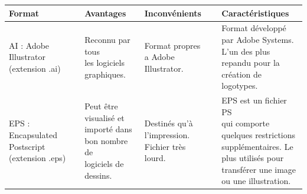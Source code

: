 \begin{table}[H]
	\centering
	\begin{tabular}{|l|l|l|l|}
		
		\hline
		\textbf{Format} & \textbf{Avantages} &
		\textbf{Inconvénients} & \textbf{Caractéristiques} \\
		\hline
		\makecell{AI : Adobe\\
			Illustrator \\(extension .ai)}
		 & \makecell{Reconnu par\\
			tous\\
			les logiciels\\
			graphiques.} & \makecell{Format propres\\ a
		Adobe Illustrator.}
		&  \makecell{Format développé\\
			par Adobe Systems.\\
			L'un des plus\\
			repandu pour la\\
			création de logotypes.}   \\
		\hline
		
		\makecell{EPS :
			Encapsulated\\
			Postscript\\
			(extension
			.eps)}
		& \makecell{Peut être\\
			visualisé et\\
			importé dans\\
			bon nombre de\\
			logiciels de\\
			dessins.} 
		& \makecell{Destinés qu'à\\
			l'impression.\\
			Fichier très\\
			lourd.}
		&  \makecell{EPS est un fichier PS\\
			qui comporte\\
			quelques restrictions\\
			supplémentaires. Le\\
			plus utilisés pour\\
			transférer une image\\
			ou une illustration.}   \\
		\hline
	

\end{tabular}
\end{table}
